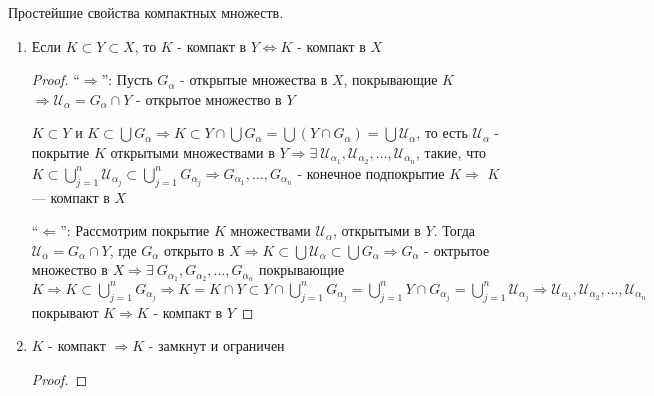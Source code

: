 \begin{theorem-non}
    Простейшие свойства компактных множеств.

    \begin{enumerate}
        \item Если $K \subset Y \subset X$, то $K$ - компакт в $Y \Longleftrightarrow K$ - компакт в $X$ 
        \begin{proof} \quad
            
            ``$\Longrightarrow$'': Пусть $G_{\alpha}$ - открытые множества в $X$, покрывающие $K$
            $\Longrightarrow \mathcal{U}_{\alpha} = G_{\alpha}\cap Y$ - открытое множество в $Y$

            $K \subset Y$ и $K \subset \bigcup G_{\alpha} \Longrightarrow K \subset Y \cap \bigcup G_{\alpha} =
            \bigcup (Y \cap G_{\alpha}) = \bigcup \mathcal{U}_{\alpha}$, то есть $\mathcal{U}_{\alpha}$ - 
            покрытие $K$ открытыми множествами в $Y \Longrightarrow \exists \ \mathcal{U}_{\alpha_1}, \mathcal{U}_{\alpha_2}, \dots, \mathcal{U}_{\alpha_n}$, 
            такие, что $K \subset \bigcup\limits_{j = 1}^{n} \mathcal{U}_{\alpha_j} \subset \bigcup\limits_{j = 1}^{n} G_{\alpha_j} \Longrightarrow 
            G_{\alpha_1}, \dots, G_{\alpha_n}$ - конечное подпокрытие $K \Longrightarrow$ $K$ --- компакт в $X$

            ``$\Longleftarrow$'': Рассмотрим покрытие $K$ множествами $\mathcal{U}_{\alpha}$, открытыми в $Y$. Тогда $\mathcal{U}_{\alpha} = G_{\alpha} \cap Y$, 
            где $G_{\alpha}$ открыто в $X \Longrightarrow K \subset \bigcup \mathcal{U}_{\alpha} \subset \bigcup G_{\alpha} \Longrightarrow
            G_{\alpha}$ - октрытое множество в $X \Longrightarrow \exists \ G_{\alpha_1}, G_{\alpha_2}, \dots, G_{\alpha_n}$ покрывающие $K \Longrightarrow
            K \subset \bigcup\limits_{j=1}^{n} G_{\alpha_j} \Longrightarrow K = K \cap Y \subset 
            Y \cap \bigcup\limits_{j=1}^{n} G_{\alpha_j} = \bigcup\limits_{j=1}^{n} Y \cap G_{\alpha_j} = \bigcup\limits_{j=1}^{n} \mathcal{U}_{\alpha_j}
            \Longrightarrow \mathcal{U}_{\alpha_1}, \mathcal{U}_{\alpha_2}, \dots, \mathcal{U}_{\alpha_n}$ покрывают $K \Longrightarrow K$ - компакт в $Y$  
        \end{proof}
        \item $K$ - компакт $\Longrightarrow K$ - замкнут и ограничен
        \begin{proof} \quad


\end{proof}
\end{enumerate}
\end{theorem-non}
